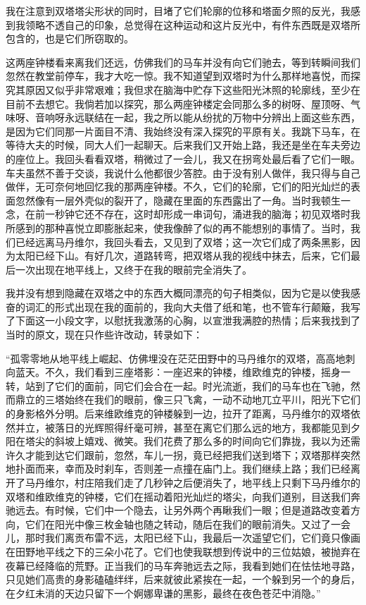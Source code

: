 \par 我在注意到双塔塔尖形状的同时，目堵了它们轮廓的位移和塔面夕照的反光，我感到我领略不透自己的印象，总觉得在这种运动和这片反光中，有件东西既是双塔所包含的，也是它们所窃取的。
\par 这两座钟楼看来离我们还远，仿佛我们的马车并没有向它们驰去，等到转瞬间我们忽然在教堂前停车，我才大吃一惊。我不知道望到双塔时为什么那样地喜悦，而探究其原因又似乎非常艰难；我但求在脑海中贮存下这些阳光沐照的轮廓线，至少在目前不去想它。我倘若加以探究，那么两座钟楼定会同那么多的树呀、屋顶呀、气味呀、音响呀永远联结在一起，我之所以能从纷扰的万物中分辨出上面这些东西，是因为它们同那一片面目不清、我始终没有深入探究的平原有关。我跳下马车，在等待大夫的时候，同大人们一起聊天。后来我们又开始上路，我还是坐在车夫旁边的座位上。我回头看看双塔，稍微过了一会儿，我又在拐弯处最后看了它们一眼。车夫虽然不善于交谈，我说什么他都很少答腔。由于没有别人做伴，我只得与自己做伴，无可奈何地回忆我的那两座钟楼。不久，它们的轮廓，它们的阳光灿烂的表面忽然像有一层外壳似的裂开了，隐藏在里面的东西露出了一角。当时我顿生一念，在前一秒钟它还不存在，这时却形成一串词句，涌进我的脑海；初见双塔时我所感到的那种喜悦立即膨胀起来，使我像醉了似的再不能想别的事情了。当时，我们已经远离马丹维尔，我回头看去，又见到了双塔；这一次它们成了两条黑影，因为太阳已经下山。有好几次，道路转弯，把双塔从我的视线中抹去，后来，它们最后一次出现在地平线上，又终于在我的眼前完全消失了。
\par 我并没有想到隐藏在双塔之中的东西大概同漂亮的句子相类似，因为它是以使我感奋的词汇的形式出现在我的面前的，我向大夫借了纸和笔，也不管车行颠簸，我写了下面这一小段文字，以慰抚我激荡的心胸，以宣泄我满腔的热情；后来我找到了当时的原文，现在只作些许改动，转录如下：
\par “孤零零地从地平线上崛起、仿佛埋没在茫茫田野中的马丹维尔的双塔，高高地刺向蓝天。不久，我们看到三座塔影：一座迟来的钟楼，维欧维克的钟楼，摇身一转，站到了它们的面前，同它们会合在一起。时光流逝，我们的马车也在飞驰，然而鼎立的三塔始终在我们的眼前，像三只飞禽，一动不动地兀立平川，阳光下它们的身影格外分明。后来维欧维克的钟楼躲到一边，拉开了距离，马丹维尔的双塔依然并立，被落日的光辉照得纤毫可辨，甚至在离它们那么远的地方，我都能见到夕阳在塔尖的斜坡上嬉戏、微笑。我们花费了那么多的时间向它们靠拢，我以为还需许久才能到达它们跟前，忽然，车儿一拐，竟已经把我们送到塔下；双塔那样突然地扑面而来，幸而及时刹车，否则差一点撞在庙门上。我们继续上路；我们已经离开了马丹维尔，村庄陪我们走了几秒钟之后便消失了，地平线上只剩下马丹维尔的双塔和维欧维克的钟楼，它们在摇动着阳光灿烂的塔尖，向我们道别，目送我们奔驰远去。有时候，它们中一个隐去，让另外两个再瞅我们一眼；但是道路改变着方向，它们在阳光中像三枚金轴也随之转动，随后在我们的眼前消失。又过了一会儿，那时我们离贡布雷不远，太阳已经下山，我最后一次遥望它们，它们竟只像画在田野地平线之下的三朵小花了。它们也使我联想到传说中的三位姑娘，被抛弃在夜幕已经降临的荒野。正当我们的马车奔驰远去之际，我看到她们在怯怯地寻路，只见她们高贵的身影磕磕绊绊，后来就彼此紧挨在一起，一个躲到另一个的身后，在夕红未消的天边只留下一个婀娜卑谦的黑影，最终在夜色苍茫中消隐。”

